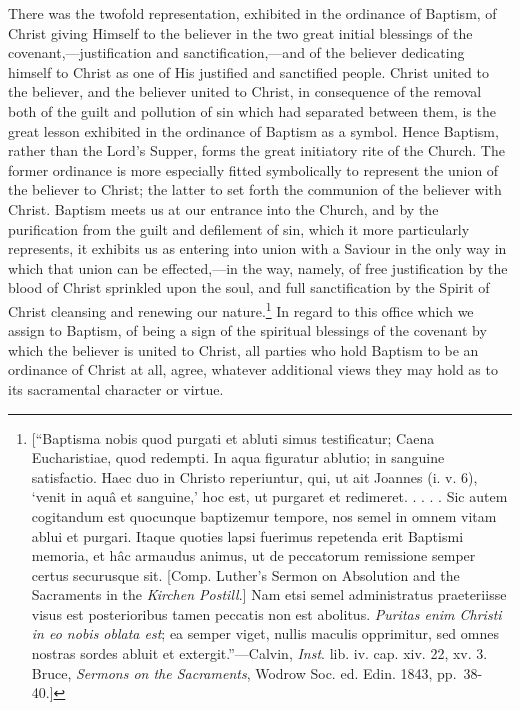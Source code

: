 \documentclass[english,]{book}
\begin{document}
There was the twofold representation, exhibited in the ordinance of Baptism, of Christ giving Himself to the believer in the two great initial blessings of the covenant,---justification and sanctification,---and of the believer dedicating himself to Christ as one of His justified and sanctified people. Christ united to the believer, and the believer united to Christ, in consequence of the removal both of the guilt and pollution of sin which had separated between them, is the great lesson exhibited in the ordinance of Baptism as a symbol. Hence Baptism, rather than the Lord's Supper, forms the great initiatory rite of the Church. The former ordinance is more especially fitted symbolically to represent the union of the believer to Christ; the latter to set forth the communion of the believer with Christ. Baptism meets us at our entrance into the Church, and by the purification from the guilt and defilement of sin, which it more particularly represents, it exhibits us as entering into union with a Saviour in the only way in which that union can be effected,---in the way, namely, of free justification by the blood of Christ sprinkled upon the soul, and full sanctification by the Spirit of Christ cleansing and renewing our nature.\footnote{{[}``Baptisma nobis quod purgati et abluti simus testificatur; Caena Eucharistiae, quod redempti. In aqua figuratur ablutio; in sanguine satisfactio. Haec duo in Christo reperiuntur, qui, ut ait Joannes (i. v. 6), `venit in aquâ et sanguine,' hoc est, ut purgaret et redimeret. . . . . Sic autem cogitandum est quocunque baptizemur tempore, nos semel in omnem vitam ablui et purgari. Itaque quoties lapsi fuerimus repetenda erit Baptismi memoria, et hâc armaudus animus, ut de peccatorum remissione semper certus securusque sit. {[}Comp. Luther's Sermon on Absolution and the Sacraments in the \emph{Kirchen Postill}.{]} Nam etsi semel administratus praeteriisse visus est posterioribus tamen peccatis non est abolitus. \emph{Puritas enim Christi in eo nobis oblata est}; ea semper viget, nullis maculis opprimitur, sed omnes nostras sordes abluit et extergit.''---Calvin, \emph{Inst}. lib. iv. cap. xiv. 22, xv. 3. Bruce, \emph{Sermons on the Sacraments}, Wodrow Soc. ed. Edin. 1843, pp.~38-40.{]}} In regard to this office which we assign to Baptism, of being a sign of the spiritual blessings of the covenant by which the believer is united to Christ, all parties who hold Baptism to be an ordinance of Christ at all, agree, whatever additional views they may hold as to its sacramental character or virtue.
\end{document}
